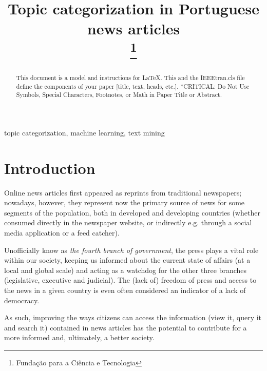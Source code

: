 \documentclass[conference]{IEEEtran}
\begin{document}

\title{Topic categorization in Portuguese news articles\\
\thanks{Fundação para a Ciência e Tecnologia} }


\author{
 }

\maketitle

\begin{abstract} This document is a model and instructions for \LaTeX.
This and the IEEEtran.cls file define the components of your paper
[title, text, heads, etc.]. *CRITICAL: Do Not Use Symbols, Special
Characters, Footnotes, or Math in Paper Title or Abstract.
\end{abstract}

\begin{IEEEkeywords} topic categorization, machine learning, text
mining \end{IEEEkeywords}

\section{Introduction}
Online news articles first appeared as reprints from traditional
newspapers; nowadays, however, they represent now the primary source
of news for some segments of the population, both in developed and
developing countries (whether consumed directly in the newspaper
website, or indirectly e.g. through a social media application or a
feed catcher).

Unofficially know as \emph{the fourth branch of government}, the press
plays a vital role within our society, keeping us informed about
the current state of affairs (at a local and global scale) and acting
as a watchdog for the other three branches (legislative, executive and
judicial). The (lack of) freedom of press and access to the news in a
given country is even often considered an indicator of a lack of
democracy\cite{goode2009social}.

As such, improving the ways citizens can access the information (view
it, query it and search it) contained in news articles has the
potential to contribute for a more informed and, ultimately, a
better society.
\end{document}
